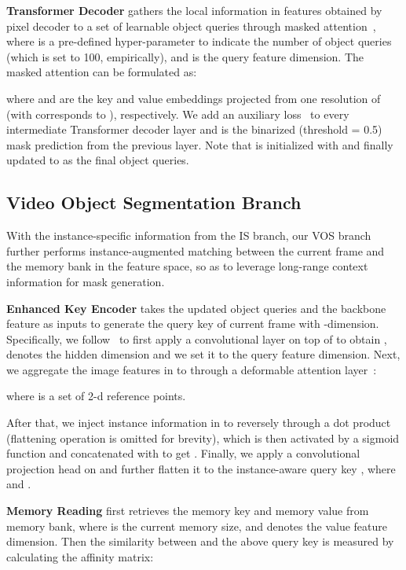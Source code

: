 \documentclass[10pt,twocolumn,letterpaper]{article}
\begin{document}
\vspace{0.02in}
\noindent \textbf{Transformer Decoder} gathers the local information in features obtained by pixel decoder to a set of learnable object queries  through masked attention~\cite{cheng2022masked}, where  is a pre-defined hyper-parameter to indicate the number of object queries (which is set to 100, empirically), and  is the query feature dimension. The masked attention can be formulated as:

where  and  are the key and value embeddings projected from one resolution of  (with  corresponds to ), respectively. We add an auxiliary loss~\cite{cheng2022masked} to every intermediate Transformer decoder layer and  is the binarized (threshold = 0.5) mask prediction from the previous  layer. Note that  is initialized with  and finally updated to  as the final object queries.


\subsection{Video Object Segmentation Branch}
\label{subsec:vos_branch}
With the instance-specific information from the IS branch, our VOS branch further performs instance-augmented matching between the current frame and the memory bank in the feature space, so as to leverage long-range context information for mask generation. 

\vspace{0.02in}
\noindent \textbf{Enhanced Key Encoder} takes the updated object queries  and the backbone feature  as inputs to generate the query key of current frame with -dimension. Specifically, we follow~\cite{cheng2021stcn} to first apply a  convolutional layer on top of  to obtain ,  denotes the hidden dimension and we set it to the query feature dimension. Next, we aggregate the image features in  to  through a deformable attention layer~\cite{zhu2021deformable}:

where  is a set of 2-d reference points. 

After that, we inject instance information in  to  reversely through a dot product (flattening operation is omitted for brevity), which is then activated by a sigmoid function and concatenated with  to get . Finally, we apply a convolutional projection head on  and further flatten it to the instance-aware query key , where  and . 

\vspace{0.02in}
\noindent \textbf{Memory Reading} first retrieves the memory key  and memory value  from memory bank, where  is the current memory size, and  denotes the value feature dimension. Then the similarity between  and the above query key  is measured by calculating the affinity matrix:
\end{document}

